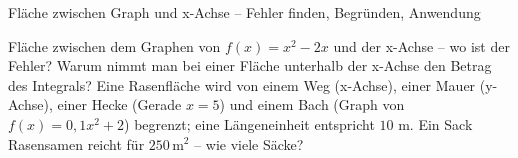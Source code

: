 \begin{aufgabe}{Fläche zwischen Graph und x-Achse – Fehler finden, Begründen, Anwendung}
\begin{teile}
\teil Fläche zwischen dem Graphen von $f(x) = x^2 - 2x$ und der x-Achse – wo ist der Fehler? 
\teil Warum nimmt man bei einer Fläche unterhalb der x-Achse den Betrag des Integrals?
\teil Eine Rasenfläche wird von einem Weg (x-Achse), einer Mauer (y-Achse), einer Hecke (Gerade $x = 5$) und einem Bach (Graph von $f(x) = 0{,}1x^2 + 2$) begrenzt; eine Längeneinheit entspricht $10$ m. Ein Sack Rasensamen reicht für $250\,\text{m}^2$ – wie viele Säcke?
\end{teile}
\end{aufgabe}
